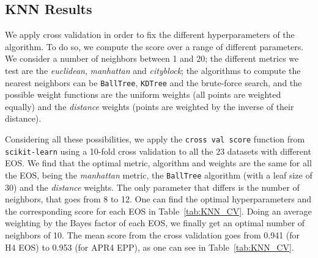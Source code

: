 \subsection{KNN Results}



We apply cross validation in order to fix the different hyperparameters of the algorithm.  To do so, we compute the score over a range of different parameters. We consider a number of neighbors between 1 and 20; the different metrics we test are the \textit{euclidean}, \textit{manhattan} and \textit{cityblock}; the algorithms to compute the nearest neighbors can be \texttt{BallTree}, \texttt{KDTree} and the brute-force search, and the possible weight functions are the uniform weights (all points are weighted equally) and the \textit{distance} weights (points are weighted by the inverse of their distance). 

Considering all these possibilities, we apply the \texttt{cross val score} function from \texttt{scikit-learn} using a 10-fold cross validation to all the 23 datasets with different EOS.  We find that the optimal metric, algorithm and weights are the same for all the EOS, being the  \textit{manhattan} metric, the \texttt{BallTree} algorithm (with a leaf size of 30) and the \textit{distance} weights. The only parameter that differs is the number of neighbors, that goes from 8 to 12. One can find the optimal hyperparameters and the corresponding score for each EOS in Table~\ref{tab:KNN_CV}. Doing an average weighting by the Bayes factor of each EOS, we finally get an optimal number of neighbors of 10. The mean score from the cross validation goes from 0.941 (for H4 EOS) to 0.953 (for APR4 EPP), as one can see in Table~\ref{tab:KNN_CV}.  


